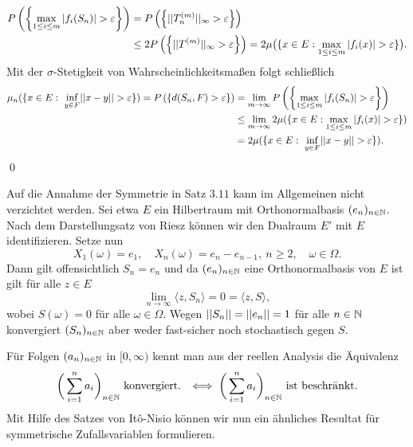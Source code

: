 \begin{proof*}
    \begin{align*}
        P\left(\left\{ \max_{1 \leq i \leq m}\left| f_i(S_n) \right| > \varepsilon \right\}\right) &= P\left(\left\{ \lvert\lvert T_n^{(m)} \rvert\rvert_{\infty} > \varepsilon \right\}\right) \\\
                                                                  &\leq 2 P\left(\left\{ \lvert\lvert T^{(m)} \rvert\rvert_{\infty} > \varepsilon \right\}\right) = 2\mu\big(\{x \in E: \max_{1\leq i \leq m}\left| f_i(x) \right| > \varepsilon\}\big).
    \end{align*}
    Mit der $\sigma$-Stetigkeit von Wahrscheinlichkeitsmaßen folgt schließlich
    \begin{align*}
        \mu_n(\{x \in E: \ \inf_{y \in F}\lvert\lvert x-y \rvert\rvert > \varepsilon \}) = P\left(\left\{ d(S_n, F) > \varepsilon \right\}\right)
                                                                     &= \lim_{m \to \infty}P\left(\left\{ \max_{1 \leq i \leq m}\left| f_i(S_n) \right| > \varepsilon \right\}\right) \\\
                                                                    &\leq \lim_{m \to \infty} 2 \mu(\{x \in E: \max_{1\leq i \leq m}\left| f_i(x) \right| > \varepsilon\}) \\\
                                                                    &= 2 \mu(\{x \in E: \ \inf_{y \in F}\lvert\lvert x-y \rvert\rvert > \varepsilon \}).
    \end{align*}
    \qed
\end{proof*}

\begin{remark}
    Auf die Annahme der Symmetrie in Satz $3.11$ kann im Allgemeinen nicht verzichtet werden. Sei etwa $E$ ein Hilbertraum mit Orthonormalbasis $(e_n)_{n \in \mathbb{N}}$.
    Nach dem Darstellungsatz von Riesz können wir den Dualraum $E'$ mit $E$ identifizieren. Setze nun 
    $$
        X_1(\omega) = e_1, \quad X_n(\omega) = e_n - e_{n-1}, \ n \geq 2, \quad \omega \in \Omega. 
    $$
    Dann gilt offensichtlich $S_n = e_n$ und da $(e_n)_{n \in \mathbb{N}}$ eine Orthonormalbasis von $E$ ist gilt für alle $z \in E$
    $$
        \lim_{n \to \infty}\langle z,S_n \rangle = 0 = \langle z,S \rangle,
    $$
    wobei $S(\omega) = 0$ für alle $\omega \in \Omega$. Wegen $\lvert\lvert S_n \rvert\rvert = \lvert\lvert e_n \rvert\rvert =1$ für alle $n \in \mathbb{N}$ konvergiert $(S_n)_{n \in \mathbb{N}}$ aber weder fast-sicher noch stochastisch gegen $S$.
    \qexampled 
\end{remark}

Für Folgen $(a_n)_{n \in \mathbb{N}}$ in $[0, \infty)$ kennt man aus der reellen Analysis die Äquivalenz
$$
    \bigg(\sum_{i=1}^n a_i\bigg)_{n \in \mathbb{N}} \text{ konvergiert. } \iff \bigg(\sum_{i=1}^n a_i\bigg)_{n \in \mathbb{N}} \text{ ist beschränkt.}
$$
Mit Hilfe des Satzes von Itô-Nisio können wir nun ein ähnliches Resultat für symmetrische Zufallsvariablen formulieren. 

